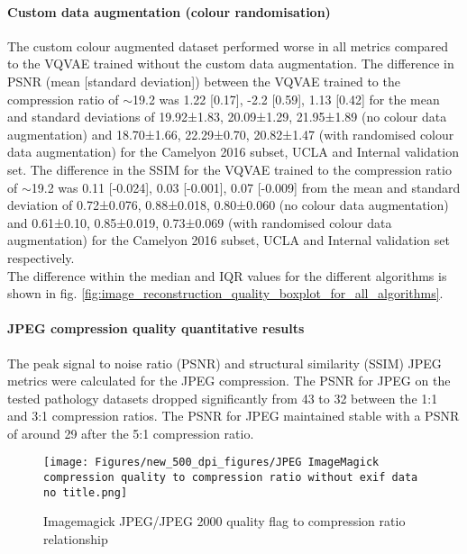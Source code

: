 \documentclass[review]{elsarticle}
\begin{document}
\paragraph{Custom data augmentation (colour randomisation)}  The custom colour augmented dataset performed worse in all metrics compared to the VQVAE trained without the custom data augmentation. The difference in PSNR (mean [standard deviation]) between the VQVAE trained to the compression ratio of $\sim$19.2 was 1.22 [0.17], -2.2 [0.59], 1.13 [0.42] for the mean and standard deviations of 19.92±1.83, 20.09±1.29, 21.95±1.89 (no colour data augmentation) and 18.70±1.66, 22.29±0.70, 20.82±1.47 (with randomised colour data augmentation) for the Camelyon 2016 subset, UCLA and Internal validation set. The difference in the SSIM for the VQVAE trained to the compression ratio of $\sim$19.2 was 0.11 [-0.024], 0.03 [-0.001], 0.07 [-0.009] from the mean and standard deviation of 0.72±0.076, 0.88±0.018, 0.80±0.060 (no colour data augmentation) and 0.61±0.10, 0.85±0.019, 0.73±0.069 (with randomised colour data augmentation) for the Camelyon 2016 subset, UCLA and Internal validation set respectively. \\
The difference within the median and IQR values for the different algorithms is shown in fig. \ref{fig:image_reconstruction_quality_boxplot_for_all_algorithms}.

\paragraph{JPEG compression quality quantitative results} The peak signal to noise ratio (PSNR) and structural similarity (SSIM) JPEG metrics were calculated for the JPEG compression. The PSNR for JPEG on the tested pathology datasets dropped significantly from 43 to 32 between the 1:1 and 3:1 compression ratios. The PSNR for JPEG maintained stable with a PSNR of around 29 after the 5:1 compression ratio.

\begin{figure}
\texttt{[image: Figures/new\_500\_dpi\_figures/JPEG ImageMagick compression quality to compression ratio without exif data no title.png]}
\caption{Imagemagick JPEG/JPEG 2000 quality flag to compression ratio relationship}
\end{figure}
\end{document}
